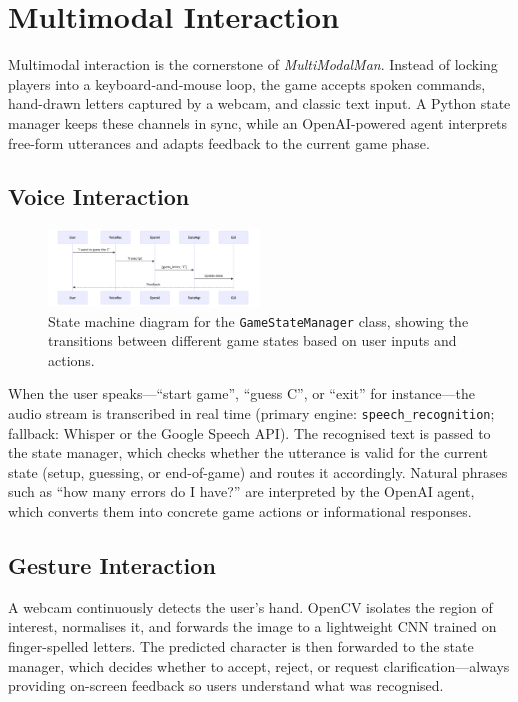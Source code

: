 \section{Multimodal Interaction}

Multimodal interaction is the cornerstone of \textit{MultiModalMan}.  
Instead of locking players into a keyboard‐and‐mouse loop, the game accepts spoken commands, hand-drawn letters captured by a webcam, and classic text input.  
A Python state manager keeps these channels in sync, while an OpenAI-powered agent interprets free-form utterances and adapts feedback to the current game phase.

\subsection{Voice Interaction}
\begin{figure}
    \centering
    \includegraphics[width=0.5\textwidth]{./images/voice_interaction_flow.png}
    \caption{State machine diagram for the \texttt{GameStateManager} class, showing the transitions between different game states based on user inputs and actions.}
    \label{fig:state_machine}
\end{figure}
When the user speaks—“start game”, “guess C”, or “exit” for instance—the audio stream is transcribed in real time (primary engine: \texttt{speech\_recognition}; fallback: Whisper or the Google Speech API).  
The recognised text is passed to the state manager, which checks whether the utterance is valid for the current state (setup, guessing, or end-of-game) and routes it accordingly.  
Natural phrases such as “how many errors do I have?” are interpreted by the OpenAI agent, which converts them into concrete game actions or informational responses.

\subsection{Gesture Interaction}

A webcam continuously detects the user’s hand.  
OpenCV isolates the region of interest, normalises it, and forwards the image to a lightweight CNN trained on finger-spelled letters.  
The predicted character is then forwarded to the state manager, which decides whether to accept, reject, or request clarification—always providing on-screen feedback so users understand what was recognised.

